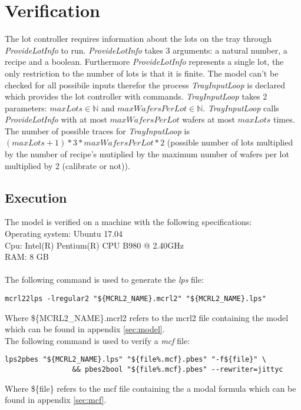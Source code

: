 \section{Verification}\label{sec:results}
The lot controller requires information about the lots on the tray through \textit{ProvideLotInfo} to run. \textit{ProvideLotInfo} takes 3 arguments: a natural number, a recipe and a boolean. Furthermore \textit{ProvideLotInfo} represents a single lot, the only restriction to the number of lots is that it is finite. The model can't be checked for all possibile inputs therefor the process \textit{TrayInputLoop} is declared which provides the lot controller with  commands. \textit{TrayInputLoop} takes 2 parameters: $\mathit{maxLots} \in \mathbb{N}$ and $\mathit{maxWafersPerLot} \in \mathbb{N}$. \textit{TrayInputLoop} calls \textit{ProvideLotInfo} with at most $\mathit{maxWafersPerLot}$ wafers at most $\mathit{maxLots}$ times. The number of possible traces for \textit{TrayInputLoop} is $(\mathit{maxLots}+1) * 3 * \mathit{maxWafersPerLot} * 2$ (possible number of lots multiplied by the number of recipe's mutiplied by the maximum number of wafers per lot multiplied by 2 (calibrate or not)). 
\subsection{Execution}
The model is verified on a machine with the following specifications:\\
Operating system: Ubuntu 17.04\\
Cpu: Intel(R) Pentium(R) CPU B980 @ 2.40GHz\\
RAM: 8 GB\\
\\
The following command is used to generate the \textit{lps} file:\\
\begin{lstlisting}[frame=single] 
mcrl22lps -lregular2 "${MCRL2_NAME}.mcrl2" "${MCRL2_NAME}.lps"
\end{lstlisting}
Where \$\{MCRL2\_NAME\}.mcrl2 refers to the mcrl2 file containing the model which can be found in appendix \ref{sec:model}.\\
The following command is used to verify a \textit{mcf} file:\\
\begin{lstlisting}[frame=single] 
lps2pbes "${MCRL2_NAME}.lps" "${file%.mcf}.pbes" "-f${file}" \
                && pbes2bool "${file%.mcf}.pbes" --rewriter=jittyc
\end{lstlisting}
Where \$\{file\} refers to the mcf file containing the a modal formula which can be found in appendix \ref{sec:mcf}.\\
